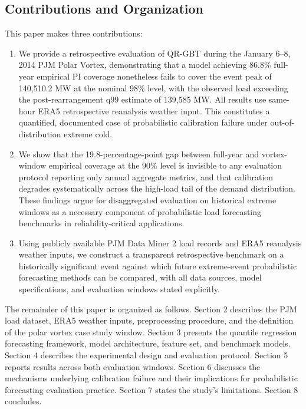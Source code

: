 \documentclass[12pt,a4paper]{article}
\begin{document}
\subsection{Contributions and Organization}
This paper makes three contributions:

\begin{enumerate}
    \item We provide a retrospective evaluation of QR-GBT during the January 6–8, 2014 PJM Polar Vortex, demonstrating that a model achieving 86.8\% full-year empirical PI coverage nonetheless fails to cover the event peak of 140,510.2 MW at the nominal 98\% level, with the observed load exceeding the post-rearrangement q99 estimate of 139,585 MW. All results use same-hour ERA5 retrospective reanalysis weather input. This constitutes a quantified, documented case of probabilistic calibration failure under out-of-distribution extreme cold.
\item We show that the 19.8-percentage-point gap between full-year and vortex-window empirical coverage at the 90\% level is invisible to any evaluation protocol reporting only annual aggregate metrics, and that calibration degrades systematically across the high-load tail of the demand distribution. These findings argue for disaggregated evaluation on historical extreme windows as a necessary component of probabilistic load forecasting benchmarks in reliability-critical applications.
\item Using publicly available PJM Data Miner 2 load records and ERA5 reanalysis weather inputs, we construct a transparent retrospective benchmark on a historically significant event against which future extreme-event probabilistic forecasting methods can be compared, with all data sources, model specifications, and evaluation windows stated explicitly.
\end{enumerate}

The remainder of this paper is organized as follows. Section 2 describes the PJM load dataset, ERA5 weather inputs, preprocessing procedure, and the definition of the polar vortex case study window. Section 3 presents the quantile regression forecasting framework, model architecture, feature set, and benchmark models. Section 4 describes the experimental design and evaluation protocol. Section 5 reports results across both evaluation windows. Section 6 discusses the mechanisms underlying calibration failure and their implications for probabilistic forecasting evaluation practice. Section 7 states the study's limitations. Section 8 concludes.
\end{document}
